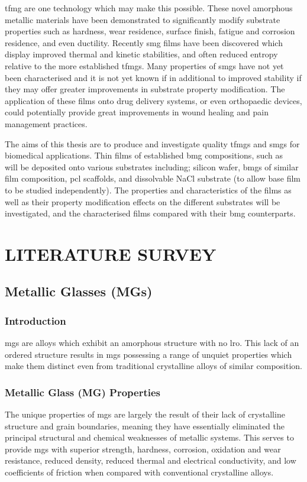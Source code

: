 \documentclass[a4paper,12pt,oneside]{report}%
\begin{document}
\Gls{tfmg} are one technology which may make this possible. These novel amorphous metallic materials have been demonstrated to significantly modify substrate properties such as hardness, wear residence, surface finish, fatigue and corrosion residence, and even ductility. Recently \gls{smg} films have been discovered which display improved thermal and kinetic stabilities, and often reduced entropy relative to the more established \gls{tfmg}s. Many properties of \gls{smg}s have not yet been characterised and it is not yet known if in additional to improved stability if they may offer greater improvements in substrate property modification. The application of these films onto drug delivery systems, or even orthopaedic devices, could potentially provide great improvements in wound healing and pain management practices.

The aims of this thesis are to produce and investigate quality \gls{tfmg}s and \gls{smg}s for biomedical applications. Thin films of established \gls{bmg} compositions, such as \MgZnCa~ will be deposited onto various substrates including; silicon wafer, \gls{bmg}s of similar film composition, \Gls{pcl} scaffolds, and dissolvable NaCl substrate (to allow base film to be studied independently). The properties and characteristics of the films as well as their property modification effects on the different substrates will be investigated, and the characterised films compared with their \gls{bmg} counterparts. 

\chapter{LITERATURE SURVEY} 
\glsresetall
{}
\section{Metallic Glasses (MGs)}
\subsection{Introduction}
\Glspl{mg} are alloys which exhibit an amorphous structure with no \gls{lro}. This lack of an ordered structure results in \glspl{mg} possessing a range of unquiet properties which make them distinct even from traditional crystalline alloys of similar composition.

\subsection{Metallic Glass (MG) Properties}
The unique properties of \glspl{mg} are largely the result of their lack of crystalline structure and grain boundaries, meaning they have essentially eliminated the principal structural and chemical weaknesses of metallic systems. This serves to provide \glspl{mg} with superior strength, hardness, corrosion, oxidation and wear resistance, reduced density, reduced thermal and electrical conductivity, and low coefficients of friction when compared with conventional crystalline alloys. 
 
\end{document}
